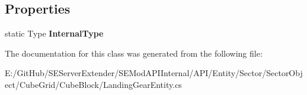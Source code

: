 \subsection*{Properties}
\begin{DoxyCompactItemize}
\item 
\hypertarget{class_s_e_mod_a_p_i_internal_1_1_a_p_i_1_1_entity_1_1_sector_1_1_sector_object_1_1_cube_grid_1_154fcaee477cbc43ff04e45ff5a3afe74_a23cf2d72fe45fcd7b44ac6d991b83182}{}static Type {\bfseries Internal\+Type}\label{class_s_e_mod_a_p_i_internal_1_1_a_p_i_1_1_entity_1_1_sector_1_1_sector_object_1_1_cube_grid_1_154fcaee477cbc43ff04e45ff5a3afe74_a23cf2d72fe45fcd7b44ac6d991b83182}

\end{DoxyCompactItemize}


The documentation for this class was generated from the following file\+:\begin{DoxyCompactItemize}
\item 
E\+:/\+Git\+Hub/\+S\+E\+Server\+Extender/\+S\+E\+Mod\+A\+P\+I\+Internal/\+A\+P\+I/\+Entity/\+Sector/\+Sector\+Object/\+Cube\+Grid/\+Cube\+Block/Landing\+Gear\+Entity.\+cs\end{DoxyCompactItemize}
